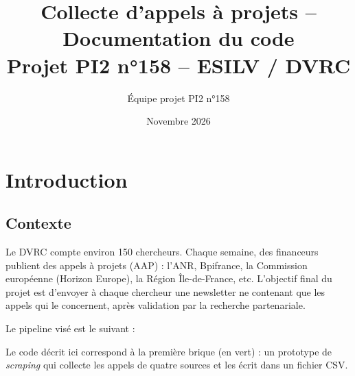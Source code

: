 \documentclass[11pt,a4paper]{article}
\title{Collecte d'appels à projets -- Documentation du code\\[4pt]
\large Projet PI2 n°158 -- ESILV / DVRC}
\author{Équipe projet PI2 n°158}
\date{Novembre 2026}
\begin{document}
\maketitle
\tableofcontents
\newpage

\section{Introduction}

\subsection{Contexte}

Le DVRC compte environ 150 chercheurs. Chaque semaine, des financeurs publient des
appels à projets (AAP) : l'ANR, Bpifrance, la Commission européenne (Horizon Europe),
la Région Île-de-France, etc. L'objectif final du projet est d'envoyer à chaque chercheur
une newsletter ne contenant que les appels qui le concernent, après validation par
la recherche partenariale.

Le pipeline visé est le suivant :

\begin{center}
\end{center}

Le code décrit ici correspond à la première brique (en vert) : un prototype de
\emph{scraping} qui collecte les appels de quatre sources et les écrit dans un fichier CSV.
\end{document}
